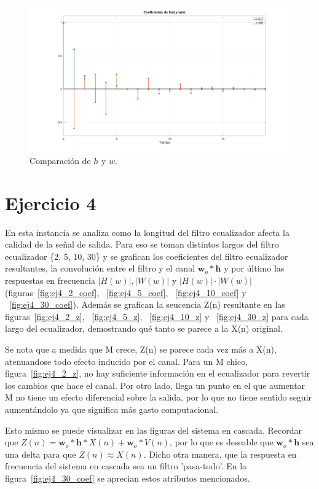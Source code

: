 \begin{figure}[!hbp]
	\centering
	\includegraphics[width=1\linewidth,trim=4cm 0 4cm 0,clip]{img/ej3_coef.pdf}
	\caption{Comparación de $h$ y $w$.}
	\label{fig:ej3_coef}
\end{figure}

\clearpage

\section{Ejercicio 4}

En esta instancia se analiza como la longitud del filtro ecualizador afecta la calidad de la señal de salida. Para eso se toman distintos largos del filtro ecualizador \{2, 5, 10, 30\} y se grafican los coeficientes del filtro ecualizador resultantes, la convolución entre el filtro y el canal $\textbf{w}_o * \textbf{h}$ y por último las respuestas en frecuencia $|H(w)|, |W(w)|$ y $|H(w)| \cdot |W(w)|$ (figuras~\ref{fig:ej4_2_coef}, ~\ref{fig:ej4_5_coef}, ~\ref{fig:ej4_10_coef} y ~\ref{fig:ej4_30_coef}). Además se grafican la seucencia Z(n) resultante en las figuras~\ref{fig:ej4_2_z}, ~\ref{fig:ej4_5_z}, ~\ref{fig:ej4_10_z} y ~\ref{fig:ej4_30_z} para cada largo del ecualizador, demostrando qué tanto se parece a la X(n) original.

Se nota que a medida que M crece, Z(n) se parece cada vez más a X(n), atenuandose todo efecto inducido por el canal. Para un M chico, figura~\ref{fig:ej4_2_z}, no hay suficiente información en el ecualizador para revertir los cambios que hace el canal. Por otro lado, llega un punto en el que aumentar M no tiene un efecto diferencial sobre la salida, por lo que no tiene sentido seguir aumentándolo ya que significa más gasto computacional.

Esto mismo se puede visualizar en las figuras del sistema en cascada. Recordar que $Z(n) = \textbf{w}_o * \textbf{h} * X(n) + \textbf{w}_o * V(n)$, por lo que es deseable que $\textbf{w}_o * \textbf{h}$ sea una delta para que $Z(n) \approx X(n)$. Dicho otra manera, que la respuesta en frecuencia del sistema en cascada sea un filtro 'pasa-todo'. En la figura~\ref{fig:ej4_30_coef} se aprecian estos atributos mencionados.

